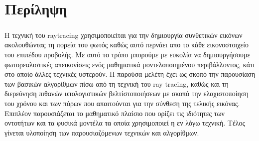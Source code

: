 
\chapter{Περίληψη}

\paragraph{} %

\begin{sloppypar}
Η τεχνική του raytracing χρησιμοποιείται για την δημιουργία συνθετικών εικόνων ακολουθώντας
τη πορεία του φωτός καθώς αυτό περνάει απο το κάθε εικονοστοιχείο του επιπέδου προβολής.
Με αυτό το τρόπο μπορούμε με ευκολία να δημιουργήσουμε φωτορεαλιστικές απεικονίσεις ενός
μαθηματικά μοντελοποιημένου περιβάλλοντος, κάτι στο οποίο άλλες τεχνικές υστερούν. Η 
παρούσα μελέτη έχει ως σκοπό την παρουσίαση των βασικών αλγορίθμων πίσω από τη τεχνική του 
ray tracing, καθώς και τη διερεύνηση πιθανών υπολογιστικών βελτίστοποιήσεων με σκοπό την 
ελαχιστοποίηση του χρόνου και των πόρων που απαιτούνται για την σύνθεση της τελικής εικόνας.
Επιπλέον παρουσιάζεται το μαθηματικό πλαίσιο που ορίζει τις ιδιότητες των οντοτήτων και τα 
φυσικά μοντέλα τα οποία χρησιμοποιεί η εν λόγω τεχνική. Τέλος γίνεται υλοποίηση των 
παρουσιαζόμενων τεχνικών και αλγορίθμων.
\end{sloppypar}

